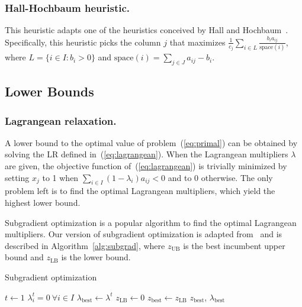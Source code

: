 \documentclass[runningheads]{llncs}
\begin{document}
\subsubsection{Hall-Hochbaum heuristic.} This heuristic adapts one of the heuristics conceived by Hall and Hochbaum~\cite{hall-hochbaum-1992-multicovering}. Specifically, this heuristic picks the column $j$ that maximizes $\frac{1}{c_j} \sum_{i \in L} \frac{b_i a_{ij}}{\text{space}(i)}$, where $L = \{i \in I : b_i > 0 \}$ and $\text{space}(i) = \sum_{j \in J} a_{ij} - b_i$.

\subsection{Lower Bounds}
\label{subsec:branch-bound:lb}

\subsubsection{Lagrangean relaxation.} A lower bound to the optimal value of problem~(\ref{eq:primal}) can be obtained by solving the LR defined in~(\ref{eq:lagrangean}). When the Lagrangean multipliers $\lambda$ are given, the objective function of~(\ref{eq:lagrangean}) is trivially minimized by setting $x_j$ to 1 when $\sum_{i \in I} (1 - \lambda_i) a_{ij} < 0$ and to 0 otherwise. The only problem left is to find the optimal Lagrangean multipliers, which yield the highest lower bound.

Subgradient optimization is a popular algorithm to find the optimal Lagrangean multipliers. Our version of subgradient optimization is adapted from~\cite{balas-carrera-1996-dynamic} and is described in Algorithm~\ref{alg:subgrad}, where $z_{\text{UB}}$ is the best incumbent upper bound and $z_{\text{LB}}$ is the lower bound.

\begin{algorithm}
  \DontPrintSemicolon
  \caption{Subgradient optimization}\label{alg:subgrad}
  $t \gets 1$\; 
  $\lambda_i^t = 0 ~ \forall i \in I$\;
  $\lambda_{\text{best}} \gets \lambda^t$\;
  $z_{\text{LB}} \gets 0$\; 
  $z_{\text{best}} \gets z_{\text{LB}}$\; 
  \Return $z_{\text{best}}$, $\lambda_{\text{best}}$
\end{algorithm}
\end{document}
